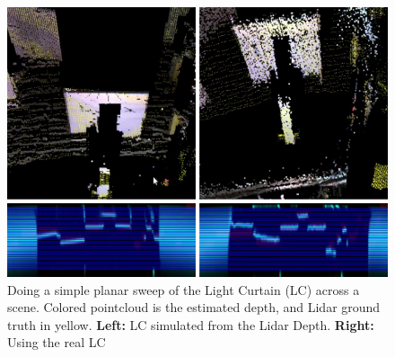 \begin{figure}
   \centering
   \begin{minipage}{0.4\textwidth}
       \centering
       \includegraphics[width=1.0\textwidth]{figures/sweep.png}
   \end{minipage}\hfill
   \centering
   \caption{Doing a simple planar sweep of the Light Curtain (LC) across a scene. Colored pointcloud is the estimated depth, and Lidar ground truth in yellow. \textbf{Left:} LC simulated from the Lidar Depth. \textbf{Right:} Using the real LC}
   \label{fig:planarsweep}
\end{figure}

